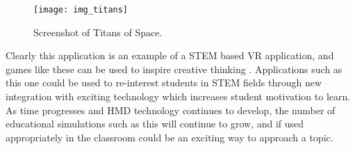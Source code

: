 \begin{figure}
  \centering
  \texttt{[image: img\_titans]}
  \caption{Screenshot of Titans of Space.}
  \label{figure:f_space}
\end{figure}

Clearly this application is an example of a STEM based VR application, and games like these can be used to inspire creative thinking \cite{merchant_effectiveness_2014}. Applications such as this one could be used to re-interest students in STEM fields through new integration with exciting technology which increases student motivation to learn. As time progresses and HMD technology continues to develop, the number of educational simulations such as this will continue to grow, and if used appropriately in the classroom could be an exciting way to approach a topic.